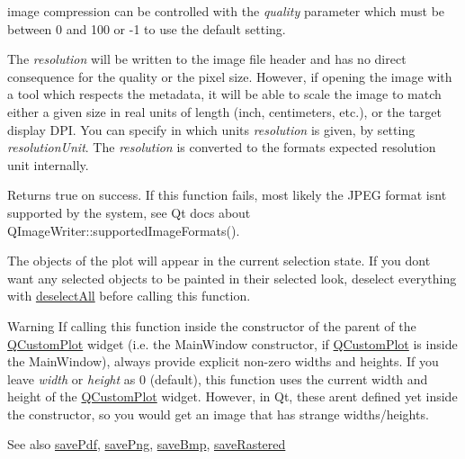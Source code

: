 image compression can be controlled with the {\itshape quality} parameter which must be between 0 and 100 or -\/1 to use the default setting.

The {\itshape resolution} will be written to the image file header and has no direct consequence for the quality or the pixel size. However, if opening the image with a tool which respects the metadata, it will be able to scale the image to match either a given size in real units of length (inch, centimeters, etc.), or the target display D\+PI. You can specify in which units {\itshape resolution} is given, by setting {\itshape resolution\+Unit}. The {\itshape resolution} is converted to the format\textquotesingle{}s expected resolution unit internally.

Returns true on success. If this function fails, most likely the J\+P\+EG format isn\textquotesingle{}t supported by the system, see Qt docs about Q\+Image\+Writer\+::supported\+Image\+Formats().

The objects of the plot will appear in the current selection state. If you don\textquotesingle{}t want any selected objects to be painted in their selected look, deselect everything with \hyperlink{classQCustomPlot_a9d4808ab925b003054085246c92a257c}{deselect\+All} before calling this function.

\begin{DoxyWarning}{Warning}
If calling this function inside the constructor of the parent of the \hyperlink{classQCustomPlot}{Q\+Custom\+Plot} widget (i.\+e. the Main\+Window constructor, if \hyperlink{classQCustomPlot}{Q\+Custom\+Plot} is inside the Main\+Window), always provide explicit non-\/zero widths and heights. If you leave {\itshape width} or {\itshape height} as 0 (default), this function uses the current width and height of the \hyperlink{classQCustomPlot}{Q\+Custom\+Plot} widget. However, in Qt, these aren\textquotesingle{}t defined yet inside the constructor, so you would get an image that has strange widths/heights.
\end{DoxyWarning}
\begin{DoxySeeAlso}{See also}
\hyperlink{classQCustomPlot_ad5acd34f6b39c3516887d7e54fec2412}{save\+Pdf}, \hyperlink{classQCustomPlot_ac92cc9256d12f354b40a4be4600b5fb9}{save\+Png}, \hyperlink{classQCustomPlot_ae3a86ed0795670e50afa21759d4fa13d}{save\+Bmp}, \hyperlink{classQCustomPlot_ad7723ce2edfa270632ef42b03a444352}{save\+Rastered} 
\end{DoxySeeAlso}
